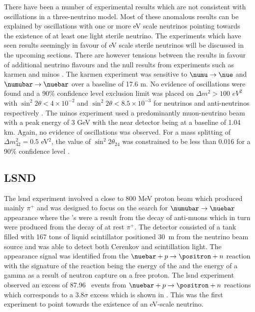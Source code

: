 There have been a number of experimental results which are not consistent with oscillations in a three-neutrino model. Most of these anomalous results can be explained by oscillations with one or more eV scale neutrinos pointing towards the existence of at least one light sterile neutrino. The experiments which have seen results seemingly in favour of eV scale sterile neutrinos will be discussed in the upcoming sections. There are however tensions between the results in favour of additional neutrino flavours and the null results from experiments such as \gls{karmen} and \gls{minos} \cite{Where_are_we_with_light_sterile_neutrinos}. The  \gls{karmen}  experiment  was  sensitive  to $\numu \rightarrow \nue$  and  $\numubar \rightarrow \nuebar$ over a baseline of 17.6 m.  No evidence of oscillations were found and a 90\% confidence level exclusion limit was placed on $\Delta m^2 > 100$ $eV^2$ with $\sin^2{2\theta} < 4\times 10^{-2}$ and $\sin^2{2\theta} < 8.5 \times 10^{-3}$ for neutrinos and anti-neutrinos respectively \cite{KARMEN}.  The \gls{minos} experiment used a predominantly muon-neutrino beam with a peak energy of 3 GeV with the near detector being at a baseline of 1.04 km.  Again, no evidence of oscillations was observed.  For a mass splitting of $\Delta m^2_{42} = 0.5$ eV$^2$, the value of $\sin^2{2\theta_{24}}$ was constrained to be less than 0.016 for a 90\% confidence level \cite{MINOS}.

\subsection{LSND}
The \gls{lsnd} experiment involved a close to 800 MeV proton beam which produced mainly $\pi^+$ and was designed to focus on the search for $\numubar \rightarrow \nuebar$ appearance where the \numubar's were a result from the decay of anti-muons which in turn were produced from the decay of at rest $\pi^+$. The detector consisted of a tank filled with 167 tons of liquid scintillator positioned 30~m from the neutrino beam source and was able to detect both Cerenkov and scintillation light. The \nuebar appearance signal was identified from the $\nuebar + p \rightarrow \positron + n$ reaction with the signature of the reaction being the energy of the \positron and the energy of a gamma as a result of neutron capture on a free proton. The \gls{lsnd} experiment observed an excess of \mbox{87.96  } events from $\nuebar + p \rightarrow \positron + n$ reactions which corresponds to a 3.8$\sigma$ excess which is shown in  \cite{LSND_excess}. This was the first experiment to point towards the existence of an eV-scale neutrino. 

